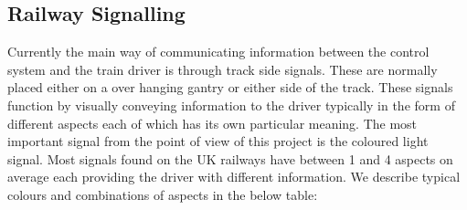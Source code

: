 \begin{comment}
A point is a physical piece of equipment that is used to 
form a junction. Due to the nature of the rails and trains it is not possible to physically
to just join two segments of track. Instead a point is needed to act as
physical switch controlling the flow of trains through a junction. A point
has two positions which are referred to as \textbf{normal} and
\textbf{reverse}. This presents a safety hazard, for example see figure \ref{fig:track}, if a train enters
the junction $B$ from $C$ when the junction is locked in the
position for normal then the train will be derailed. 
\end{comment}


\subsection{Railway Signalling}
Currently the main way of communicating information between the control system and the train driver is through track side signals. These are normally placed either on a over hanging gantry or either side of the track. These signals function by visually conveying information to the driver typically in the form of different  aspects each of which has its own particular meaning. The most important signal from the point of view of this project is the coloured light signal. Most signals found on the UK railways have between 1 and 4 aspects on average each providing the driver with different information. We describe typical colours and combinations of aspects in the below table:

\begin{comment}
Signals are the main means used to communicate information regarding the state
of the track ahead of the train. Typically they are placed either on the track
side or over hanging the railway. Visual indications known as aspects are used
to convey information to the driver. A signal will have many such aspects
which can be displayed, each with a particular meaning. The main type of signal
considered in this project is the coloured light signal. Typically these have
between one - four aspects each conveying a different indication about the state of
the track ahead. Below is a description of the
aspects used for a three light signal.  
\end{comment}



